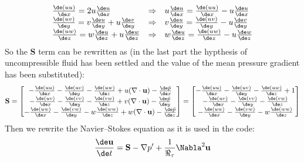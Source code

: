 \renewcommand\arraystretch{1.5}
\[
\begin{array}{lcl}
\frac{\de (uu)}{\de x}=2u\frac{\de u}{\de x} & \Rightarrow & u\frac{\de u}{\de x}=\frac{\de (uu)}{\de x} -u\frac{\de u}{\de x}\\
\frac{\de (uv)}{\de y}=v\frac{\de u}{\de y}+u\frac{\de v}{\de y} & \Rightarrow & v\frac{\de u}{\de y}=\frac{\de (uv)}{\de y} -u\frac{\de v}{\de y}\\
\frac{\de (uw)}{\de z}=w\frac{\de u}{\de z}+u\frac{\de w}{\de z} & \Rightarrow & w\frac{\de u}{\de z}=\frac{\de (uw)}{\de z} -u\frac{\de w}{\de z}\\
\end{array}
\]
\renewcommand\arraystretch{1}
So the $\mathbf S$ term can be rewritten as (in the last part the hypthesis of uncompressible fluid has been settled and the value of the mean pressure gradient has been substituted):
\renewcommand\arraystretch{1.5}
\[
\mathbf S=
\begin{bmatrix}
-\frac{\de (uu)}{\de x}-\frac{\de (uv)}{\de y}-\frac{\de (uw)}{\de z}+u(\nabla\cdot \mathbf u)-\frac{\de \bar p}{\de x}\\
-\frac{\de (uv)}{\de x}-\frac{\de (vv)}{\de y}-\frac{\de (vw)}{\de z}+v(\nabla\cdot \mathbf u)-\frac{\de \bar p}{\de y}\\
-\frac{\de (uw)}{\de x}-\frac{\de (vw)}{\de y}-w\frac{\de (ww)}{\de z}+w(\nabla\cdot \mathbf u)-\frac{\de \bar p}{\de z}\\
\end{bmatrix}
=
\begin{bmatrix}
-\frac{\de (uu)}{\de x}-\frac{\de (uv)}{\de y}-\frac{\de (uw)}{\de z}+1\\
-\frac{\de (uv)}{\de x}-\frac{\de (vv)}{\de y}-\frac{\de (vw)}{\de z}\\
-\frac{\de (uw)}{\de x}-\frac{\de (vw)}{\de y}-w\frac{\de (ww)}{\de z}\\
\end{bmatrix}
\]
\renewcommand\arraystretch{1}
Then we rewrite the Navier--Stokes equation as it is used in the code:
\begin{equation}
\frac{\de \mathbf u}{\de t}=\mathbf S-\nabla p'+\frac{1}{\Re_\tau}\Nabla^2 \mathbf u
\end{equation}

